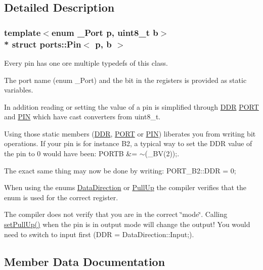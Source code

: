 \subsection{Detailed Description}
\subsubsection*{template$<$enum \+\_\+\+Port p, uint8\+\_\+t b$>$\\*
struct ports\+::\+Pin$<$ p, b $>$}

Every pin has one ore multiple typedefs of this class. 

The port name (enum \+\_\+\+Port) and the bit in the registers is provided as static variables.

In addition reading or setting the value of a pin is simplified through \hyperlink{structports_1_1Pin_aaebb4d6cb5db0635fe8e7d6e7d315c7f}{D\+DR} \hyperlink{structports_1_1Pin_aaa08f0eb17ef31d9f46d65d50c8a093e}{P\+O\+RT} and \hyperlink{structports_1_1Pin_ae2e45a41082457c350f71f7a720265d4}{P\+IN} which have cast converters from uint8\+\_\+t.

Using those static members (\hyperlink{structports_1_1Pin_aaebb4d6cb5db0635fe8e7d6e7d315c7f}{D\+DR}, \hyperlink{structports_1_1Pin_aaa08f0eb17ef31d9f46d65d50c8a093e}{P\+O\+RT} or \hyperlink{structports_1_1Pin_ae2e45a41082457c350f71f7a720265d4}{P\+IN}) liberates you from writing bit operations. If your pin is for instance B2, a typical way to set the D\+DR value of the pin to 0 would have been\+: {\ttfamily P\+O\+R\+TB \&= $\sim$(\+\_\+\+B\+V(2));}.

The exact same thing may now be done by writing\+: {\ttfamily P\+O\+R\+T\+\_\+\+B2\+::\+D\+DR = 0;}

When using the enums \hyperlink{namespaceports_a46987e78fa447129742fadda5eccafb4}{Data\+Direction} or \hyperlink{namespaceports_a49bf0ccedb4cfed89a328574e53bec07}{Pull\+Up} the compiler verifies that the enum is used for the correct register.

The compiler does not verify that you are in the correct \char`\"{}mode\char`\"{}. Calling \hyperlink{structports_1_1Pin_a11ba9e7aeda2d867780dee32234f2c7e}{set\+Pull\+Up()} when the pin is in output mode will change the output! You would need to switch to input first ({\ttfamily D\+DR = Data\+Direction\+::\+Input;}). 

\subsection{Member Data Documentation}

